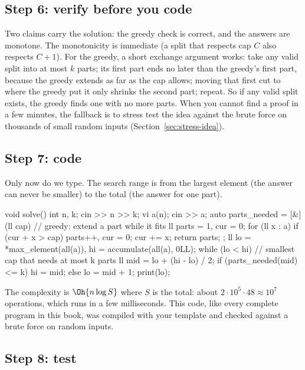 \subsection{Step 6: verify before you code}

Two claims carry the solution: the greedy check is correct, and the answers are monotone. The monotonicity is immediate (a
split that respects cap $C$ also respects $C + 1$). For the greedy, a short exchange argument works: take any valid split
into at most $k$ parts; its first part ends no later than the greedy's first part, because the greedy extends as far as the
cap allows; moving that first cut to where the greedy put it only shrinks the second part; repeat. So if any valid split
exists, the greedy finds one with no more parts. When you cannot find a proof in a few minutes, the fallback is to stress
test the idea against the brute force on thousands of small random inputs (Section~\ref{sec:stress-idea}).

\subsection{Step 7: code}

Only now do we type. The search range is from the largest element (the answer can never be smaller) to the total (the
answer for one part).

\begin{code}
void solve() {
    int n, k;
    cin >> n >> k;
    vi a(n);
    cin >> a;
    auto parts_needed = [&](ll cap) {  // greedy: extend a part while it fits
        ll parts = 1, cur = 0;
        for (ll x : a) {
            if (cur + x > cap) parts++, cur = 0;
            cur += x;
        }
        return parts;
    };
    ll lo = *max_element(all(a)), hi = accumulate(all(a), 0LL);
    while (lo < hi) {  // smallest cap that needs at most k parts
        ll mid = lo + (hi - lo) / 2;
        if (parts_needed(mid) <= k) hi = mid;
        else lo = mid + 1;
    }
    print(lo);
}
\end{code}

The complexity is $\Oh{n \log S}$ where $S$ is the total: about $2 \cdot 10^5 \cdot 48 \approx 10^7$ operations, which runs
in a few milliseconds. This code, like every complete program in this book, was compiled with your template and checked
against a brute force on random inputs.

\subsection{Step 8: test}

